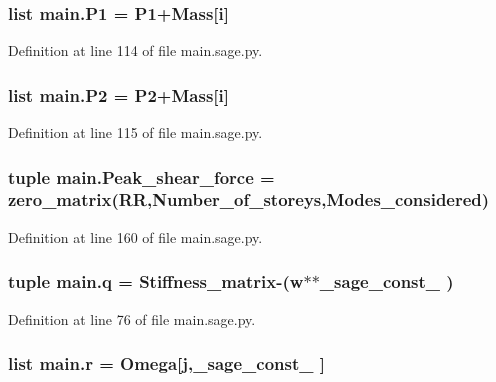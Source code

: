 \subsubsection[{P1}]{\setlength{\rightskip}{0pt plus 5cm}list main.\+P1 = P1+Mass\mbox{[}{\bf i}\mbox{]}}\label{namespacemain_add7e0394c94a2e2115aff785eb6995e3}


Definition at line 114 of file main.\+sage.\+py.

\hypertarget{namespacemain_a1b83b7a3849a8e1c84b9906c45625fec}{}
\subsubsection[{P2}]{\setlength{\rightskip}{0pt plus 5cm}list main.\+P2 = P2+Mass\mbox{[}{\bf i}\mbox{]}}\label{namespacemain_a1b83b7a3849a8e1c84b9906c45625fec}


Definition at line 115 of file main.\+sage.\+py.

\hypertarget{namespacemain_a9e135aea550f8ea419857f817a196d56}{}
\subsubsection[{Peak\+\_\+shear\+\_\+force}]{\setlength{\rightskip}{0pt plus 5cm}tuple main.\+Peak\+\_\+shear\+\_\+force = zero\+\_\+matrix(R\+R,Number\+\_\+of\+\_\+storeys,{\bf Modes\+\_\+considered})}\label{namespacemain_a9e135aea550f8ea419857f817a196d56}


Definition at line 160 of file main.\+sage.\+py.

\hypertarget{namespacemain_a1787a37505189f764069a45071189112}{}
\subsubsection[{q}]{\setlength{\rightskip}{0pt plus 5cm}tuple main.\+q = {\bf Stiffness\+\_\+matrix}-\/({\bf w}$\ast$$\ast${\bf \+\_\+sage\+\_\+const\+\_} )}\label{namespacemain_a1787a37505189f764069a45071189112}


Definition at line 76 of file main.\+sage.\+py.

\hypertarget{namespacemain_a4760f4121f66000c5570f75176649cb8}{}
\subsubsection[{r}]{\setlength{\rightskip}{0pt plus 5cm}list main.\+r = {\bf Omega}\mbox{[}{\bf j},\+\_\+sage\+\_\+const\+\_ \mbox{]}}\label{namespacemain_a4760f4121f66000c5570f75176649cb8}


